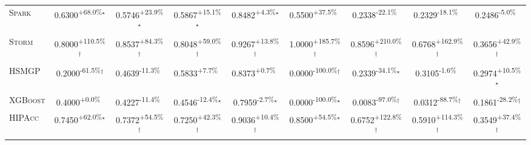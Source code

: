 \begin{table}[htbp]
\begin{tabular}{l|cccc|cccc}
\textsc{Spark} & \cellcolor{green!30}0.6300\textsuperscript{+68.0\%}$^\star$ & \cellcolor{green!30}0.5746\textsuperscript{+23.9\%}$^\star$ & \cellcolor{green!30}0.5867\textsuperscript{+15.1\%}$^\star$ & \cellcolor{green!30}0.8482\textsuperscript{+4.3\%}$^\star$ & \cellcolor{green!30}0.5500\textsuperscript{+37.5\%}$^{\,\,\,}$ & \cellcolor{red!30}0.2338\textsuperscript{-22.1\%}$^{\,\,\,}$ & \cellcolor{red!30}0.2329\textsuperscript{-18.1\%}$^{\,\,\,}$ & \cellcolor{red!30}0.2486\textsuperscript{-5.0\%}$^{\,\,\,}$ \\
\textsc{Storm} & \cellcolor{green!30}0.8000\textsuperscript{+110.5\%}$^\dagger$ & \cellcolor{green!30}0.8537\textsuperscript{+84.3\%}$^\dagger$ & \cellcolor{green!30}0.8048\textsuperscript{+59.0\%}$^\dagger$ & \cellcolor{green!30}0.9267\textsuperscript{+13.8\%}$^\dagger$ & \cellcolor{green!30}1.0000\textsuperscript{+185.7\%}$^\dagger$ & \cellcolor{green!30}0.8596\textsuperscript{+210.0\%}$^\dagger$ & \cellcolor{green!30}0.6768\textsuperscript{+162.9\%}$^\dagger$ & \cellcolor{green!30}0.3656\textsuperscript{+42.9\%}$^\dagger$ \\
\textsc{HSMGP} & \cellcolor{red!30}0.2000\textsuperscript{-61.5\%}$^\dagger$ & \cellcolor{red!30}0.4639\textsuperscript{-11.3\%}$^{\,\,\,}$ & \cellcolor{green!30}0.5833\textsuperscript{+7.7\%}$^{\,\,\,}$ & \cellcolor{green!30}0.8373\textsuperscript{+0.7\%}$^{\,\,\,}$ & \cellcolor{red!30}0.0000\textsuperscript{-100.0\%}$^\dagger$ & \cellcolor{red!30}0.2339\textsuperscript{-34.1\%}$^\star$ & \cellcolor{red!30}0.3105\textsuperscript{-1.6\%}$^{\,\,\,}$ & \cellcolor{green!30}0.2974\textsuperscript{+10.5\%}$^\star$ \\
\textsc{XGBoost} & \cellcolor{green!30}0.4000\textsuperscript{+0.0\%}$^{\,\,\,}$ & \cellcolor{red!30}0.4227\textsuperscript{-11.4\%}$^{\,\,\,}$ & \cellcolor{red!30}0.4546\textsuperscript{-12.4\%}$^\star$ & \cellcolor{red!30}0.7959\textsuperscript{-2.7\%}$^\star$ & \cellcolor{red!30}0.0000\textsuperscript{-100.0\%}$^\star$ & \cellcolor{red!30}0.0083\textsuperscript{-97.0\%}$^\dagger$ & \cellcolor{red!30}0.0312\textsuperscript{-88.7\%}$^\dagger$ & \cellcolor{red!30}0.1861\textsuperscript{-28.2\%}$^\dagger$ \\
\textsc{HIPAcc} & \cellcolor{green!30}0.7450\textsuperscript{+62.0\%}$^\star$ & \cellcolor{green!30}0.7372\textsuperscript{+54.5\%}$^\dagger$ & \cellcolor{green!30}0.7250\textsuperscript{+42.3\%}$^\dagger$ & \cellcolor{green!30}0.9036\textsuperscript{+10.4\%}$^\dagger$ & \cellcolor{green!30}0.8500\textsuperscript{+54.5\%}$^\star$ & \cellcolor{green!30}0.6752\textsuperscript{+122.8\%}$^\dagger$ & \cellcolor{green!30}0.5910\textsuperscript{+114.3\%}$^\dagger$ & \cellcolor{green!30}0.3549\textsuperscript{+37.4\%}$^\dagger$ \\

\end{tabular}
\end{table}
